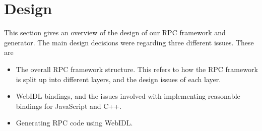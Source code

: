 \chapter{Design}
\label{Chapter4}

This section gives an overview of the design of our RPC framework and generator. The main design decisions were regarding three different issues. These are

\begin{itemize}
	\item The overall RPC framework structure. This refers to how the RPC framework is split up into different layers, and the design issues of each layer.
	\item WebIDL bindings, and the issues involved with implementing reasonable bindings for JavaScript and C++.
	\item Generating RPC code using WebIDL.
\end{itemize}


\pagebreak


\pagebreak


\pagebreak